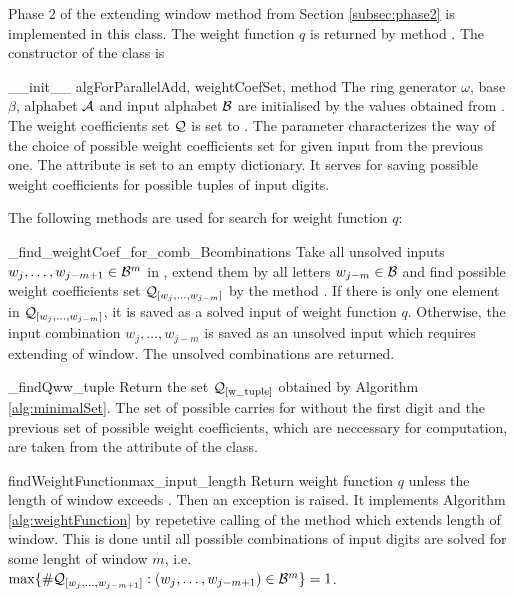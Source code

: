 Phase 2 of the extending window method from Section \ref{subsec:phase2} is implemented in this class. The weight function $q$ is returned by method . The constructor of the class is

\begin{method}{\_\_init\_\_}{ algForParallelAdd, weightCoefSet, method}
The ring generator $\omega$, base $\beta$, alphabet $\mathcal{A}$ and input alphabet $\mathcal{B}$ are initialised by the values obtained from . The weight coefficients set $\mathcal{Q}$ is set to . The parameter  characterizes the way of the choice of possible weight coefficients set for given input from the previous one. The attribute  is set to an empty dictionary. It serves for saving possible weight coefficients for possible tuples of input digits.
\end{method}

The following methods are used for search for weight function $q$:

\begin{method}{\_find\_weightCoef\_for\_comb\_B}{combinations}
Take all unsolved inputs $w_j,\dots, w_{j-m+1} \in \mathcal{B}^m$ in , extend them by all letters $w_{j-m}\in\mathcal{B}$ and find possible weight coefficients set $\mathcal{Q}_{[w_j,\dots, w_{j-m}]}$ by the method . If there is only one element in $\mathcal{Q}_{[w_j,\dots, w_{j-m}]}$, it is saved as a solved input of weight function $q$. Otherwise, the input combination $w_j,\dots, w_{j-m}$ is saved as an unsolved input which requires extending of window. The unsolved combinations are returned.  
\end{method}


\begin{method}{\_findQw}{w\_tuple}
Return the set $\mathcal{Q}_{[\text{w\_tuple}]}$ obtained by Algorithm \ref{alg:minimalSet}. The set of possible carries for  without the first digit and the previous set of possible weight coefficients, which are neccessary for computation, are taken from the attribute  of the class.
\end{method}


\begin{method}{findWeightFunction}{max\_input\_length}
Return weight function $q$ unless the length of window exceeds . Then an exception is raised. It implements Algorithm \ref{alg:weightFunction} by repetetive calling of the method  which extends length of window. This is done until all possible combinations of input digits are solved for some lenght of window $m$, i.e. $\max\{\#\mathcal{Q}_{[w_j,\dots, w_{j-m+1}]}:(w_j,\dots, w_{j-m+1}) \in \mathcal{B}^m \} = 1$.
\end{method}


